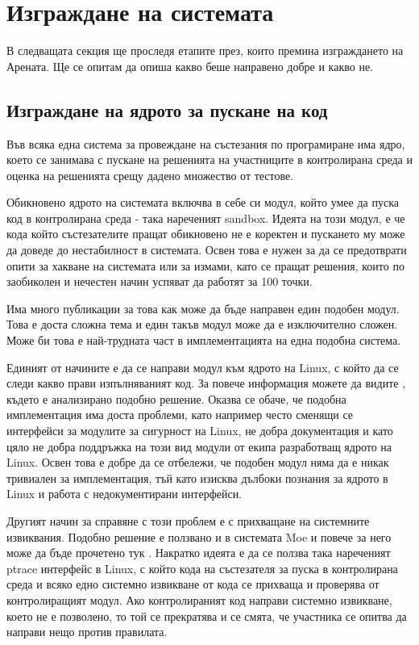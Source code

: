 \documentclass[a4paper,12pt]{article}
\begin{document}
  \section{Изграждане на системата}
  В следващата секция ще проследя етапите през, които премина изграждането на
  Арената. Ще се опитам да опиша какво беше направено добре и какво не.
  \subsection{Изграждане на ядрото за пускане на код}
  Във всяка една система за провеждане на състезания по програмиране има ядро,
  което се занимава с пускане на решенията на участниците в контролирана среда
  и оценка на решенията срещу дадено множество от тестове.

  Обикновено ядрото на системата включва в себе си модул, който умее да пуска код в контролирана среда - така нареченият sandbox. Идеята на този модул, е че кода който състезателите пращат обикновено не е коректен и пускането му може да доведе до нестабилност в системата. Освен това е нужен за да се предотврати опити за хакване на системата или за измами, като се пращат решения, които по заобиколен и нечестен начин успяват да работят за 100 точки.
  
  Има много публикации за това как може да бъде направен един подобен модул. Това е доста сложна тема и един такъв модул може да е изключително сложен. Може би това е най-трудната част в имплементацията на една подобна система.
  
  Единият от начините е да се направи модул към ядрото на Linux, с който да се следи какво прави изпълняваният код. За повече информация можете да видите \cite{linux_sec_module_sandbox}, където е анализирано подобно решение. Оказва се обаче, че подобна имплементация има доста проблеми, като например често сменящи се интерфейси за модулите за сигурност на Linux, не добра документация и като цяло не добра поддръжка на този вид модули от екипа разработващ ядрото на Linux. Освен това е добре да се отбележи, че подобен модул няма да е никак тривиален за имплементация, тъй като изисква дълбоки познания за ядрото в Linux и работа с недокументирани интерфейси.
  
  Другият начин за справяне с този проблем е с прихващане на системните извиквания. Подобно решение е ползвано и в системата Moe и повече за него може да бъде прочетено тук \cite{perspectives_grading_systems}. Накратко идеята е да се ползва така нареченият ptrace интерфейс в Linux, с който кода на състезателя за пуска в контролирана среда и всяко едно системно извикване от кода се прихваща и проверява от контролиращият модул. Ако контролираният код направи системно извикване, което не е позволено, то той се прекратява и се смята, че участника се опитва да направи нещо против правилата.
  
\end{document}

